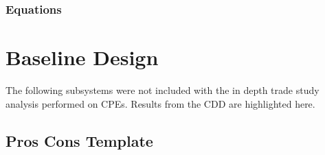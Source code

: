 \documentclass[3p]{elsarticle}
\begin{document}
\subsubsection{Equations}

\section{Baseline Design}

The following subsystems were not included with the in depth trade study analysis performed on CPEs.  Results from the CDD are highlighted here.
\bigskip

\subsection{Pros Cons Template}
\end{document}
